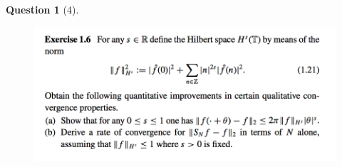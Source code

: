 \documentclass{article} %
\theoremstyle{quest}
\newtheorem*{question}{Question}
\begin{document}
\newpage

\begin{question}[4]
\hfill
\begin{figure}[h!]
  \centering
    \includegraphics[width=1\textwidth]{HA-1-4.png}
\end{figure}
\end{question}
\end{document}
